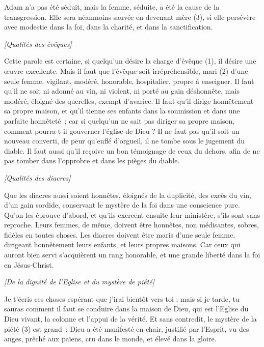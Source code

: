 \begin{multicols}{2}
Adam n’a pas été séduit, mais la femme, séduite, a été la cause de la transgression.
Elle sera néanmoins sauvée en devenant mère (3), si elle persévère avec modestie dans la foi, dans la charité, et dans la sanctification.
\begin{center}
\textit{[Qualités des évêques]}
\end{center}
\VerseOne{}Cette parole est certaine, si quelqu'un désire la charge d’évêque (1), il désire une œuvre excellente.
Mais il faut que l'évêque soit irrépréhensible, mari (2) d'une seule femme, vigilant, modéré, honorable, hospitalier, propre à enseigner.
Il faut qu’il ne soit ni adonné au vin, ni violent, ni porté au gain déshonnête, mais modéré, éloigné des querelles, exempt d’avarice.
Il faut qu’il dirige honnêtement sa propre maison, et qu’il tienne ses enfants dans la soumission et dans une parfaite honnêteté ;
car si quelqu'un ne sait pas diriger sa propre maison, comment pourra-t-il gouverner l'église de Dieu ?
Il ne faut pas qu’il soit un nouveau converti, de peur qu'enflé d'orgueil, il ne tombe sous le jugement du diable.
Il faut aussi qu'il reçoive un bon témoignage de ceux du dehors, afin de ne pas tomber dans l’opprobre et dans les pièges du diable.
\begin{center}
\textit{[Qualités des diacres]}
\end{center}
\PPE{}
Que les diacres aussi soient honnêtes, éloignés de la duplicité, des excès du vin, d’un gain sordide,
conservant le mystère de la foi dans une conscience pure.
Qu’on les éprouve d’abord, et qu’ils exercent ensuite leur ministère, s’ils sont sans reproche.
Leurs femmes, de même, doivent être honnêtes, non médisantes, sobres, fidèles en toutes choses.
Les diacres doivent être maris d'une seule femme, dirigeant honnêtement leurs enfants, et leurs propres maisons.
Car ceux qui auront bien servi s’acquièrent un rang honorable, et une grande liberté dans la foi en Jésus-Christ.
\begin{center}
\textit{[De la dignité de l'Eglise et du mystère de piété]}
\end{center}
\PPE{}
Je t'écris ces choses espérant que j'irai bientôt vers toi ;
mais si je tarde, tu sauras comment il faut se conduire dans la maison de Dieu, qui est l'Eglise du Dieu vivant, la colonne et l'appui de la vérité.
Et sans contredit, le mystère de la piété (3) est grand : Dieu a été manifesté en chair, justifié par l’Esprit, vu des anges, prêché aux païens, cru dans le monde, et élevé dans la gloire.

\end{multicols}
